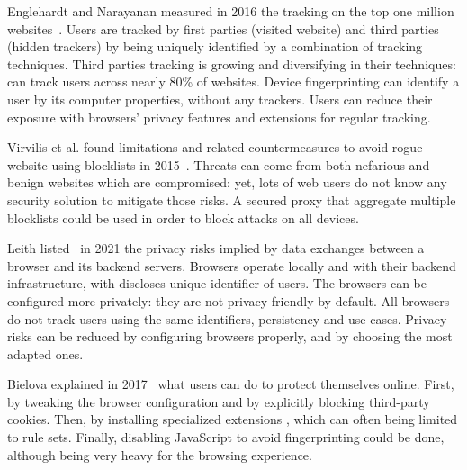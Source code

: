 Englehardt and Narayanan measured in 2016 the tracking on the top one million websites~\cite{englehardt_online_2016}. Users are tracked by first parties (visited website) and third parties (hidden trackers) by being uniquely identified by a combination of tracking techniques. Third parties tracking is growing and diversifying in their techniques:  can track users across nearly 80\% of websites. Device fingerprinting can identify a user by its computer properties, without any trackers. Users can reduce their exposure with browsers' privacy features and extensions for regular tracking. %

Virvilis et al. found limitations and related countermeasures to avoid rogue website using blocklists in 2015~\cite{virvilis_security_2015}. Threats can come from both nefarious and benign websites which are compromised: yet, lots of web users do not know any security solution to mitigate those risks. A secured \gls{proxy} that aggregate multiple blocklists could be used in order to block attacks on all devices. %

Leith listed~\cite{leith_web_2021} in 2021 the privacy risks implied by data exchanges between a browser and its \gls{backend} servers. Browsers operate locally and with their backend infrastructure, with discloses unique identifier of users. The browsers can be configured more privately: they are not privacy-friendly by default. All browsers do not track users using the same identifiers, persistency and use cases. Privacy risks can be reduced by configuring browsers properly, and by choosing the most adapted ones. %

Bielova explained in 2017~\cite{bielova_web_2017} what users can do to protect themselves online. First, by tweaking the browser configuration and by explicitly blocking third-party cookies. Then, by installing specialized extensions \cite{7961988}, which can often being limited to rule sets. Finally, disabling JavaScript to avoid fingerprinting could be done, although being very heavy for the browsing experience. %

